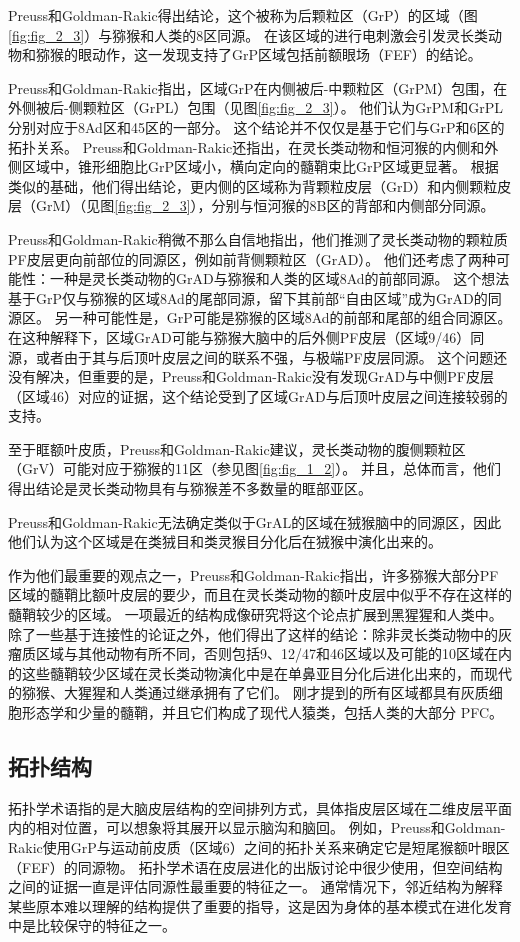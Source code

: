 Preuss和Goldman-Rakic得出结论，这个被称为后颗粒区（GrP）的区域（图 \ref{fig:fig_2_3}）与猕猴和人类的8区同源。
在该区域的进行电刺激会引发灵长类动物\cite{wu2000converging}和猕猴\cite{bruce1985primate}的眼动作，这一发现支持了GrP区域包括前额眼场（FEF）的结论。


Preuss和Goldman-Rakic指出，区域GrP在内侧被后-中颗粒区（GrPM）包围，在外侧被后-侧颗粒区（GrPL）包围（见图\ref{fig:fig_2_3}）。
他们认为GrPM和GrPL分别对应于8Ad区和45区的一部分。
这个结论并不仅仅是基于它们与GrP和6区的拓扑关系。
Preuss和Goldman-Rakic还指出，在灵长类动物和恒河猴的内侧和外侧区域中，锥形细胞比GrP区域小，横向定向的髓鞘束比GrP区域更显著。
根据类似的基础，他们得出结论，更内侧的区域称为背颗粒皮层（GrD）和内侧颗粒皮层（GrM）（见图\ref{fig:fig_2_3}），分别与恒河猴的8B区的背部和内侧部分同源。


Preuss和Goldman-Rakic稍微不那么自信地指出，他们推测了灵长类动物的颗粒质PF皮层更向前部位的同源区，例如前背侧颗粒区（GrAD）。
他们还考虑了两种可能性：一种是灵长类动物的GrAD与猕猴和人类的区域8Ad的前部同源。
这个想法基于GrP仅与猕猴的区域8Ad的尾部同源，留下其前部“自由区域”成为GrAD的同源区。
另一种可能性是，GrP可能是猕猴的区域8Ad的前部和尾部的组合同源区。
在这种解释下，区域GrAD可能与猕猴大脑中的后外侧PF皮层（区域9/46）同源，或者由于其与后顶叶皮层之间的联系不强，与极端PF皮层同源\cite{preuss2007evolutionary}。
这个问题还没有解决，但重要的是，Preuss和Goldman-Rakic没有发现GrAD与中侧PF皮层（区域46）对应的证据，这个结论受到了区域GrAD与后顶叶皮层之间连接较弱的支持。


至于眶额叶皮质，Preuss和Goldman-Rakic建议，灵长类动物的腹侧颗粒区（GrV）可能对应于猕猴的11区（参见图\ref{fig:fig_1_2}）。
并且，总体而言，他们得出结论是灵长类动物具有与猕猴差不多数量的眶部亚区。


Preuss和Goldman-Rakic无法确定类似于GrAL的区域在狨猴脑中的同源区，因此他们认为这个区域是在类狨目和类灵猴目分化后在狨猴中演化出来的。


作为他们最重要的观点之一，Preuss和Goldman-Rakic指出，许多猕猴大部分PF区域的髓鞘比额叶皮层的要少，而且在灵长类动物的额叶皮层中似乎不存在这样的髓鞘较少的区域。
一项最近的结构成像研究将这个论点扩展到黑猩猩和人类中\cite{glasser2011comparative}。
除了一些基于连接性的论证之外，他们得出了这样的结论：除非灵长类动物中的灰瘤质区域与其他动物有所不同，否则包括9、12/47和46区域以及可能的10区域在内的这些髓鞘较少区域在灵长类动物演化中是在单鼻亚目分化后进化出来的，而现代的猕猴、大猩猩和人类通过继承拥有了它们。
刚才提到的所有区域都具有灰质细胞形态学和少量的髓鞘，并且它们构成了现代人猿类，包括人类的大部分 PFC。


\subsection{拓扑结构}
拓扑学术语指的是大脑皮层结构的空间排列方式，具体指皮层区域在二维皮层平面内的相对位置，可以想象将其展开以显示脑沟和脑回。
例如，Preuss和Goldman-Rakic使用GrP与运动前皮质（区域6）之间的拓扑关系来确定它是短尾猴额叶眼区（FEF）的同源物。
拓扑学术语在皮层进化的出版讨论中很少使用，但空间结构之间的证据一直是评估同源性最重要的特征之一。
通常情况下，邻近结构为解释某些原本难以理解的结构提供了重要的指导，这是因为身体的基本模式在进化发育中是比较保守的特征之一。


